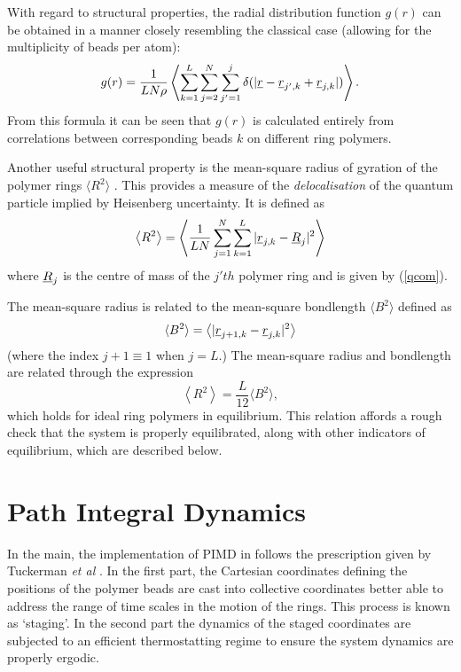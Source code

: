 With regard to structural properties, the radial distribution function
$g(r)$ can be obtained in a manner closely resembling the classical
case (allowing for the multiplicity of beads per atom):
\begin{equation}
  g(r)=\frac{1}{LN \rho} \left \langle \sum_{k=1}^{L} \sum_{j=2}^{N} \sum_{j'=1}^{j}
  \delta(|\mbox{$\underline{r}$}-\mbox{$\underline{r}$}_{j',k}+\mbox{$\underline{r}$}_{j,k}|) \right \rangle .
\end{equation}
From this formula it can be seen that $g(r)$ is calculated entirely
from correlations between corresponding beads $k$ on different ring
polymers.

Another useful structural property is the mean-square radius of
gyration of the polymer rings $\langle R^{2} \rangle$ . This provides a
measure of the {\em delocalisation} of the quantum particle implied by
Heisenberg uncertainty. It is defined as
\begin{equation}
  \left \langle R^{2} \right \rangle = \left \langle \frac{1}{LN}
  \sum_{j=1}^{N} \sum_{k=1}^{L} | \mbox{$\underline{r}$}_{j,k}-\mbox{$\underline{R}$}_{j} |^{2} \right \rangle
\end{equation}
where $\mbox{$\underline{R}$}_{j}$ is the centre of mass of the $j'th$ polymer ring
and is given by (\ref{qcom}).

The mean-square radius is related to the mean-square bondlength $
\langle B^{2} \rangle $ defined as
\begin{equation}
  \langle B^{2} \rangle =\left \langle |\mbox{$\underline{r}$}_{j+1,k}-\mbox{$\underline{r}$}_{j,k}|^{2} \right \rangle
\end{equation}
(where the index $j+1 \equiv 1$ when $j=L$.) The mean-square
radius and bondlength are related through the expression
\begin{equation}
  \left \langle R^{2} \right \rangle =\frac{L}{12} \langle B^{2} \rangle,
\end{equation}
which holds for ideal ring polymers in equilibrium. This relation
affords a rough check that the system is properly equilibrated, along
with other indicators of equilibrium, which are described below.

\section{Path Integral Dynamics}
\label{pimddynamics}
In the main, the implementation of PIMD in \D{} follows the
prescription given by Tuckerman {\em et al} \cite{tuckerman-93a}. In
the first part, the Cartesian coordinates defining the positions of
the polymer beads are cast into collective coordinates better able to
address the range of time scales in the motion of the rings. This
process is known as `staging'. In the second part the dynamics of the
staged coordinates are subjected to an efficient thermostatting regime
to ensure the system dynamics are properly ergodic.

